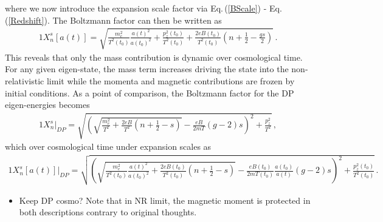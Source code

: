 \documentclass[Universe,article,submit,moreauthors,pdftex]{Definitions/mdpi}
\newcommand{\req}[1]{Eq.\,(\ref{#1})}
\newcommand*{\xred}{\color{red}}
\begin{document}
where we now introduce the expansion scale factor via \req{BScale} - \req{Redshift}. The Boltzmann factor can then be written as
\begin{alignat}{1}
    \label{XScale} X_{n}^{s}[a(t)] = \sqrt{\frac{m_{e}^{2}}{T^{2}(t_{0})}\frac{a(t)^{2}}{a(t_{0})^{2}}+\frac{p_{z}^{2}(t_{0})}{T^{2}(t_{0})}+\frac{2eB(t_{0})}{T^{2}(t_{0})}\left(n+\frac{1}{2}-\frac{gs}{2}\right)}\,.
\end{alignat}
This reveals that only the mass contribution is dynamic over cosmological time. For any given eigen-state, the mass term increases driving the state into the non-relativistic limit while the momenta and magnetic contributions are frozen by initial conditions. As a point of comparison, the Boltzmann factor for the DP eigen-energies becomes
\begin{alignat}{1}
    \label{XDP} X_{n}^{s}\vert_{DP} = \sqrt{\left(\sqrt{\frac{m_{e}^{2}}{T^{2}}+\frac{2eB}{T^{2}}\left(n+\frac{1}{2}-s\right)}-\frac{eB}{2mT}(g-2)s\right)^{2}+\frac{p_{z}^{2}}{T^{2}}}\,,
\end{alignat}
which over cosmological time under expansion scales as
\begin{alignat}{1}
    \label{XScaleDP} X_{n}^{s}[a(t)]\vert_{DP} = \sqrt{\left(\sqrt{\frac{m_{e}^{2}}{T^{2}(t_{0})}\frac{a(t)^{2}}{a(t_{0})^{2}}+\frac{2eB(t_{0})}{T^{2}(t_{0})}\left(n+\frac{1}{2}-s\right)}-\frac{eB(t_{0})}{2mT(t_{0})}\frac{a(t_{0})}{a(t)}(g-2)s\right)^{2}+\frac{p_{z}^{2}(t_{0})}{T^{2}(t_{0})}}\,.
\end{alignat}

\begin{itemize}
    \item {\xred Keep DP cosmo? Note that in NR limit, the magnetic moment is protected in both descriptions contrary to original thoughts.}
\end{itemize}
\end{document}
